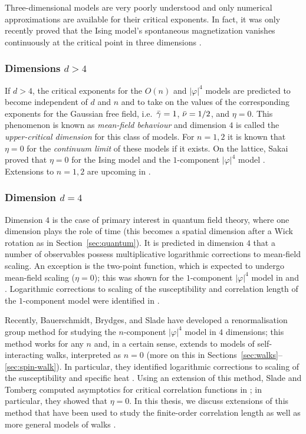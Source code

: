 Three-dimensional models are very poorly understood and only numerical approximations
are available for their critical exponents. In fact, it was only recently proved
that the Ising model's spontaneous magnetization vanishes continuously at
the critical point in three dimensions \cite{ADS15}.

\subsubsection{Dimensions $d > 4$}

If $d > 4$, the critical exponents for the $O(n)$ and $|\varphi|^4$ models are
predicted to become independent of $d$ and $n$ and to take on the values of the
corresponding exponents for the Gaussian free field, i.e.\ $\bar\gamma = 1$,
$\bar\nu = 1/2$, and $\eta = 0$.
This phenomenon is known as \emph{mean-field behaviour} and dimension $4$ is
called the \emph{upper-critical dimension} for this class of models.
For $n = 1, 2$ it is known that $\eta = 0$
for the \emph{continuum limit} of these models \cite{Aiz82,Fro82} if it exists.
On the lattice, Sakai proved that $\eta = 0$ for the Ising model \cite{Sakai07}
and the $1$-component $|\varphi|^4$ model \cite{Sakai15}.
Extensions to $n = 1, 2$ are upcoming in \cite{BHH17}.

\subsubsection{Dimension $d = 4$}

Dimension $4$ is the case of primary interest in quantum field theory, where one
dimension plays the role of time (this becomes a spatial dimension after a Wick
rotation as in Section~\ref{sec:quantum}).
It is predicted in dimension $4$ that a number of observables possess multiplicative
logarithmic corrections to mean-field scaling. An exception is the two-point function,
which is expected to undergo
mean-field scaling ($\eta = 0$); this was shown for the $1$-component $|\varphi|^4$
model in \cite{GK85} and \cite{FMRS87}. Logarithmic corrections to scaling of the
susceptibility and correlation length of the $1$-component model were identified in
\cite{Hara87,HT87}.

Recently, Bauerschmidt, Brydges, and Slade \cite{BS-rg-norm,BS-rg-loc,BBS-rg-pt,BS-rg-IE,BS-rg-step}
have developed a renormalisation group
method for studying the $n$-component $|\varphi|^4$ model in $4$ dimensions; this
method works for any $n$ and, in a certain sense, extends to models of
self-interacting walks, interpreted as $n = 0$ (more on this in
Sections~\ref{sec:walks}--\ref{sec:spin-walk}).
In particular, they identified logarithmic corrections to scaling of the susceptibility
and specific heat \cite{BBS-phi4-log}. Using an extension of this method, Slade and
Tomberg computed asymptotics for critical correlation functions in \cite{ST-phi4};
in particular, they showed that $\eta = 0$.
In this thesis, we discuss extensions of this method that have been used to study
the finite-order correlation length \cite{BSTW-clp} as well as more general models
of walks \cite{BSW-saw-sa}.

